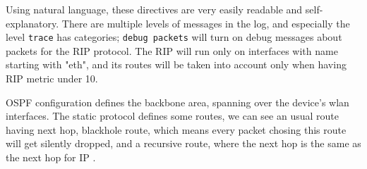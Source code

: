 


Using natural language, these directives are very easily readable and
self-explanatory. There are multiple levels of messages in the log, and
especially the level \texttt{trace} has categories; \texttt{debug packets}
will turn on debug messages about packets for the RIP protocol. The RIP will
run only on interfaces with name starting with "eth", and its routes will be
taken into account only when having RIP metric under 10.

OSPF configuration defines the backbone area, spanning over the device's wlan
interfaces. The static protocol defines some routes, we can see an usual route
having next hop, blackhole route, which means every packet chosing this route
will get silently dropped, and a recursive route, where the next hop is the
same as the next hop for IP .
